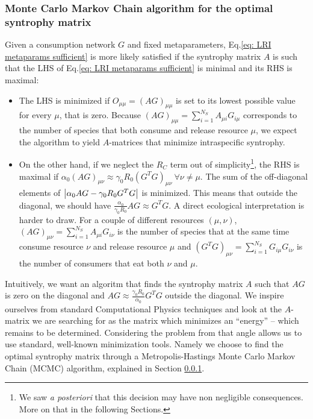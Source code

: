 \documentclass[12pt, titlepage]{report}
\begin{document}
\subsubsection{Monte Carlo Markov Chain algorithm for the optimal syntrophy matrix} \label{section: methods LRI MC solver}

Given a consumption network $G$ and fixed metaparameters, Eq.\eqref{eq: LRI metaparams sufficient} is more likely satisfied if the syntrophy matrix $A$ is such that the LHS of Eq.\eqref{eq: LRI metaparams sufficient} is minimal and its RHS is maximal:
\begin{itemize}
\item The LHS is minimized if $O_{\mu\mu}=(AG)_{\mu\mu}$ is set to its lowest possible value for every $\mu$, that is zero. Because $(AG)_{\mu\mu}=\sum_{i=1}^{N_S} A_{\mu i} G_{i\mu}$ corresponds to the number of species that both consume and release resource $\mu$, we expect the algorithm to yield $A$-matrices that minimize intraspecific syntrophy.
\item On the other hand, if we neglect the $R_C$ term out of simplicity\footnote{We saw \textit{a posteriori} that this decision may have non negligible consequences. More on that in the following Sections.}, the RHS is maximal if $\alpha_0(AG)_{\mu\nu}\approx\gamma_0R_0 (G^TG)_{\mu\nu} \ \forall \nu\neq\mu$. The sum of the off-diagonal elements of $\left|{\alpha_0 AG-\gamma_0 R_0 G^T G}\right|$ is minimized. This means that outside the diagonal, we should have $\frac{\alpha_0}{\gamma_0 R_0} AG \approx  G^T G$. A direct ecological interpretation is harder to draw. For a couple of different resources $(\mu,\nu)$,  $(AG)_{\mu\nu}=\sum_{i=1}^{N_S} A_{\mu i} G_{i\nu}$ is the number of species that at the same time consume resource $\nu$ and release resource $\mu$ and $(G^TG)_{\mu\nu}=\sum_{i=1}^{N_S} G_{i\mu}G_{i\nu}$ is the number of consumers that eat both $\nu$ and $\mu$.

\end{itemize}
Intuitively, we want an algoritm that finds the syntrophy matrix $A$ such that $AG$ is zero on the diagonal and $AG \approx \frac{\gamma_0R_0}{\alpha_0}G^TG$ outside the diagonal. We inspire ourselves from standard Computational Physics techniques and look at the $A$-matrix we are searching for as the matrix which minimizes an ``energy'' -- which remains to be determined. Considering the problem from that angle allows us to use standard, well-known minimization tools. Namely we choose to find the optimal syntrophy matrix through a Metropolis-Hastings Monte Carlo Markov Chain (MCMC) algorithm, explained in Section \ref{section: methods LRI MC solver}.
\end{document}
